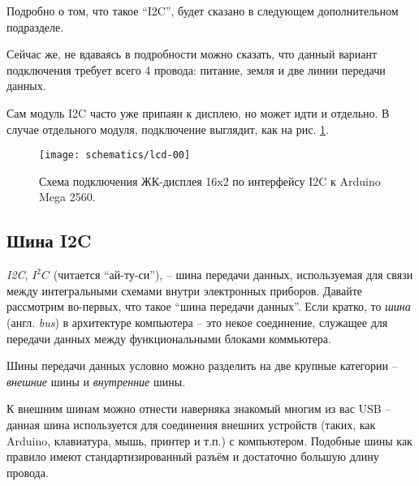 \documentclass[../sparc.tex]{subfiles}
\begin{document}
Подробно о том, что такое ``I2C'', будет сказано в следующем дополнительном
подразделе.

Сейчас же, не вдаваясь в подробности можно сказать, что данный вариант
подключения требует всего 4 провода: питание, земля и две линии передачи данных.

Сам модуль I2C часто уже припаян к дисплею, но может идти и отдельно.  В случае
отдельного модуля, подключение выглядит, как на рис. \ref{fig:lcd-00}.

\begin{figure}[h]
  \centering
  \texttt{[image: schematics/lcd-00]}
  \caption{Схема подключения ЖК-дисплея 16x2 по интерфейсу I2C к Arduino Mega
    2560.}
  \label{fig:lcd-00}
\end{figure}

\subsection{Шина I2C \Star}





\textit{\gls{I2C}}, $I^{2}C$ (читается ``ай-ту-си''), -- шина передачи данных,
используемая для связи между интегральными схемами внутри электронных приборов.
Давайте рассмотрим во-первых, что такое ``шина передачи данных''.  Если кратко,
то \textit{шина} (англ. \textit{bus}) в архитектуре компьютера -- это некое
соединение, служащее для передачи данных между функциональными блоками
коммьютера.

Шины передачи данных условно можно разделить на две крупные категории --
\textit{внешние} шины и \textit{внутренние} шины.

К внешним шинам можно отнести наверняка знакомый многим из вас \gls{USB} --
данная шина используется для соединения внешних устройств (таких, как Arduino,
клавиатура, мышь, принтер и т.п.) с компьютером.  Подобные шины как правило
имеют стандартизированный разъём и достаточно большую длину провода.
\end{document}
